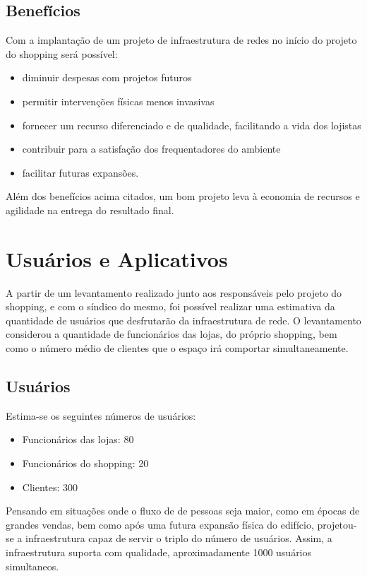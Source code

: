 \documentclass[	DIV=calc,%
							paper=a4,%
							fontsize=12pt,%
							onecolumn]{scrartcl}	 					%
\begin{document}
\subsection{Benefícios}
Com a implantação de um projeto de infraestrutura de redes no início do projeto do shopping será possível:
\begin{itemize}
	\item diminuir despesas com projetos futuros
	\item permitir intervenções físicas menos invasivas 
	\item fornecer um recurso diferenciado e de qualidade, facilitando a vida dos lojistas
	\item contribuir para a satisfação dos frequentadores do ambiente
 	\item facilitar futuras expansões.
\end{itemize}
Além dos benefícios acima citados, um bom projeto leva à economia de recursos e agilidade na entrega do resultado final.

\section{Usuários e Aplicativos}
A partir de um levantamento realizado junto aos responsáveis pelo projeto do shopping, e com o síndico do mesmo, foi possível realizar uma estimativa da quantidade de usuários que desfrutarão da infraestrutura de rede.
O levantamento considerou a quantidade de funcionários das lojas, do próprio shopping, bem como o número médio de clientes que o espaço irá comportar simultaneamente.

\subsection{Usuários}
Estima-se os seguintes números de usuários:
\begin{itemize}
	\item Funcionários das lojas: 80
	\item Funcionários do shopping: 20
	\item Clientes: 300
\end{itemize}
Pensando em situações onde o fluxo de de pessoas seja maior, como em épocas de grandes vendas, bem como após uma futura expansão física do edifício, projetou-se a infraestrutura capaz de servir o triplo do número de usuários.
Assim, a infraestrutura suporta com qualidade, aproximadamente 1000 usuários simultaneos.
\end{document}
